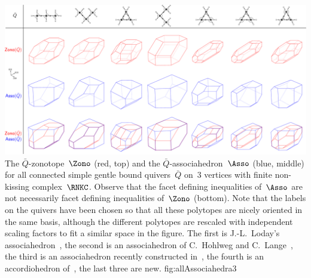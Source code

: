 \documentclass{memo-l}
\theoremstyle{definition}
\begin{document}
\captionsetup{width=1.5\textwidth}
{\includegraphics[scale=.27]{allAssociahedra3}}
{The $\bar Q$-zonotope~$\Zono$ (red, top) and the $\bar Q$-associahedron~$\Asso$ (blue, middle) for all connected simple gentle bound quivers~$\bar Q$ on~$3$ vertices with finite non-kissing complex~$\RNKC$. Observe that the facet defining inequalities of~$\Asso$ are not necessarily facet defining inequalities of~$\Zono$ (bottom). Note that the labels on the quivers have been chosen so that all these polytopes are nicely oriented in the same basis, although the different polytopes are rescaled with independent scaling factors to fit a similar space in the figure. The first is J.-L.~Loday's associahedron~\cite{Loday}, the second is an associahedron of C.~Hohlweg and C.~Lange~\cite{HohlwegLange}, the third is an associahedron recently constructed in~\cite{HohlwegPilaudStella}, the fourth is an accordiohedron of~\cite{MannevillePilaud-accordion}, the last three are new.}
{fig:allAssociahedra3}
\captionsetup{width=\textwidth}


\backmatter



\label{sec:biblio}

\printindex
\end{document}
